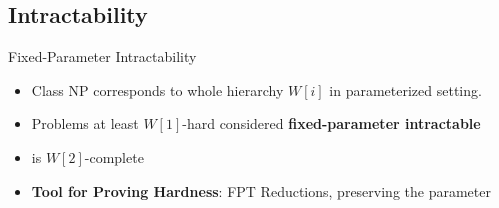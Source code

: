 \subsection{Intractability}
\begin{frame}[c]{Fixed-Parameter Intractability}
    \begin{itemize}
       \pause \item  Class NP corresponds to whole hierarchy $W[i]$ in parameterized setting.
       \pause \item Problems at least $W[1]$-hard considered \textbf{fixed-parameter intractable}
       \pause \item \dom is $W[2]$-complete
       \pause \item \textbf{Tool for Proving Hardness}: FPT Reductions, preserving the parameter
    \end{itemize}
\end{frame}

